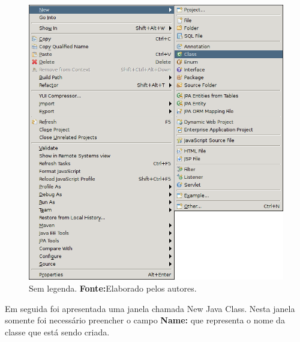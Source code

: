 	\begin{figure}[h!]
		\centerline{\includegraphics[scale=0.8]{./imagens/2_q_metodologico/4_procedimentos_resultados/43_webservice/432_desenvolvimento/desws9.png}}
		\caption[Sem legenda]{Sem legenda.
			\textbf{Fonte:}Elaborado pelos autores.}
		\label{fig:desws9}
	\end{figure}
	
	\pagebreak


	\par Em seguida foi apresentada uma janela chamada New Java Class. Nesta
janela somente foi necessário preencher o campo \textbf{Name:} que representa o
nome da classe que está sendo criada.
	
	
	
